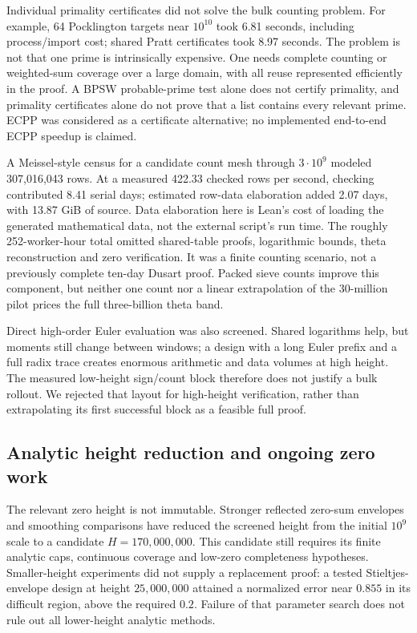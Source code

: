 \documentclass[11pt]{amsart}
\theoremstyle{definition}
\begin{document}
Individual primality certificates did not solve the bulk counting problem.
For example, 64 Pocklington targets near $10^{10}$ took 6.81 seconds,
including process/import cost; shared Pratt certificates took 8.97 seconds.
The problem is not that one prime is intrinsically expensive. One needs
complete counting or weighted-sum coverage over a large domain, with all
reuse represented efficiently in the proof. A BPSW probable-prime test alone
does not certify primality, and primality certificates alone do not prove
that a list contains every relevant prime. ECPP was considered as a
certificate alternative; no implemented end-to-end ECPP speedup is claimed.

A Meissel-style census for a candidate count mesh through $3\cdot10^9$
modeled 307,016,043 rows. At a measured 422.33 checked rows per second,
checking contributed 8.41 serial days; estimated row-data elaboration added
2.07 days, with 13.87 GiB of source. Data elaboration here is Lean's cost of
loading the generated mathematical data, not the external script's run
time. The roughly 252-worker-hour total omitted shared-table proofs,
logarithmic bounds, theta reconstruction and zero verification. It was a
finite counting scenario, not a previously complete ten-day Dusart proof.
Packed sieve counts improve this component, but neither one count nor a
linear extrapolation of the 30-million pilot prices the full three-billion
theta band.

Direct high-order Euler evaluation was also screened. Shared logarithms
help, but moments still change between windows; a design with a long
Euler prefix and a full radix trace creates enormous arithmetic and data
volumes at high height. The measured low-height sign/count block therefore
does not justify a bulk rollout. We rejected that layout for high-height
verification, rather than extrapolating its first successful block as a
feasible full proof.

\subsection{Analytic height reduction and ongoing zero work}
The relevant zero height is not immutable. Stronger reflected zero-sum
envelopes and smoothing comparisons have reduced the screened height from
the initial $10^9$ scale to a candidate $H=170{,}000{,}000$. This candidate
still requires its finite analytic caps, continuous coverage and low-zero
completeness hypotheses. Smaller-height experiments did not supply a
replacement proof: a tested Stieltjes-envelope design at height
$25{,}000{,}000$ attained a normalized error near $0.855$ in its difficult
region, above the required $0.2$. Failure of that parameter search does
not rule out all lower-height analytic methods.
\end{document}
